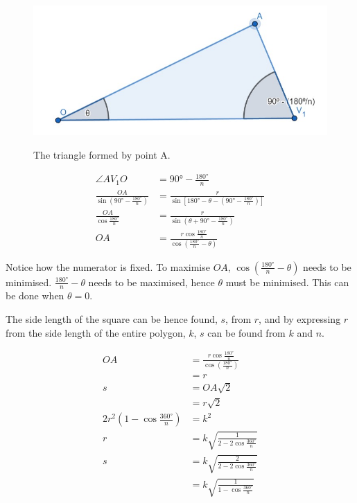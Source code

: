 \documentclass[12pt]{scrartcl}
\begin{document}
\begin{figure}[htpb]
	\centering
	\includegraphics[scale=.75]{images/rq2_1_2.jpg}
	\label{fig:rq2_1_2_img}
	\caption{The triangle formed by point A.}
\end{figure}

\begin{align*}
	\angle AV_{1}O & = \ang{90} - \frac{\ang{180}}{n}     \\
	\frac{OA}{\sin \left(\ang{90} - \frac{\ang{180}}{n}\right)} & = \frac{r}{\sin \left[\ang{180} - \theta - \left(\ang{90} - \frac{\ang{180}}{n}\right)\right]}  \\
	\frac{OA}{\cos \frac{\ang{180}}{n}} & = \frac{r}{\sin \left(\theta + \ang{90} - \frac{\ang{180}}{n}\right)}    \\
	OA & = \frac{r \cos \frac{\ang{180}}{n}}{\cos \left(\frac{\ang{180}}{n} - \theta\right)}
\end{align*}

Notice how the numerator is fixed. To maximise $OA$, $\cos \left(\frac{\ang{180}}{n} - \theta\right)$ needs to be minimised. $\frac{\ang{180}}{n} - \theta$ needs to be maximised, hence $\theta$ must be minimised. This can be done when $\theta = 0$.

The side length of the square can be hence found, $s$, from $r$, and by expressing $r$ from the side length of the entire polygon, $k$, $s$ can be found from $k$ and $n$.

\begin{align*}
	OA & = \frac{r \cos \frac{\ang{180}}{n}}{\cos \left(\frac{\ang{180}}{n}\right)}  \\
	& = r  \\
	s & = OA\sqrt{2} \\
	& = r\sqrt{2} \\
	2r^2 \left(1 - \cos \frac{\ang{360}}{n}\right) & = k^2  \\
	r & = k\sqrt{\frac{1}{2 - 2\cos\frac{\ang{360}}{n}}}  \\
	s & = k\sqrt{\frac{2}{2 - 2\cos\frac{\ang{360}}{n}}}  \\
	& = k\sqrt{\frac{1}{1 - \cos\frac{\ang{360}}{n}}}
\end{align*}
\end{document}
